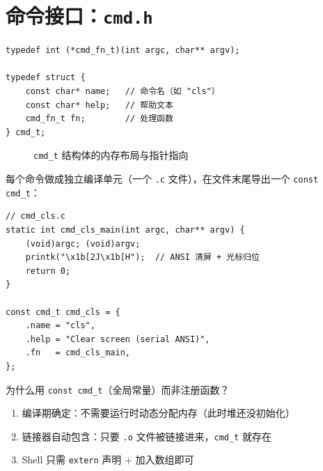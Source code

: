 \section{命令接口：\texttt{cmd.h}}

\begin{lstlisting}[style=cstyle]
typedef int (*cmd_fn_t)(int argc, char** argv);

typedef struct {
    const char* name;   // 命令名（如 "cls"）
    const char* help;   // 帮助文本
    cmd_fn_t fn;        // 处理函数
} cmd_t;
\end{lstlisting}

\begin{figure}[H]
  \centering
  
  \caption{\texttt{cmd\_t} 结构体的内存布局与指针指向}
\end{figure}

每个命令做成独立编译单元（一个 \texttt{.c} 文件），在文件末尾导出一个
\texttt{const cmd\_t}：

\begin{lstlisting}[style=cstyle]
// cmd_cls.c
static int cmd_cls_main(int argc, char** argv) {
    (void)argc; (void)argv;
    printk("\x1b[2J\x1b[H");  // ANSI 清屏 + 光标归位
    return 0;
}

const cmd_t cmd_cls = {
    .name = "cls",
    .help = "Clear screen (serial ANSI)",
    .fn   = cmd_cls_main,
};
\end{lstlisting}

\begin{designbox}
为什么用 \texttt{const cmd\_t}（全局常量）而非注册函数？

\begin{enumerate}
  \item 编译期确定：不需要运行时动态分配内存（此时堆还没初始化）
  \item 链接器自动包含：只要 \texttt{.o} 文件被链接进来，\texttt{cmd\_t} 就存在
  \item Shell 只需 \texttt{extern} 声明 + 加入数组即可
\end{enumerate}
\end{designbox}


